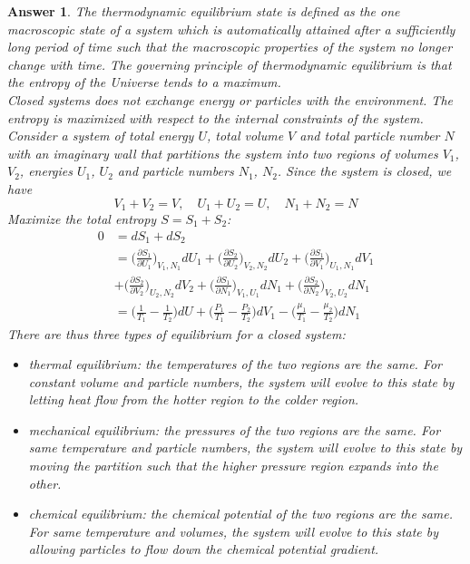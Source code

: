 \documentclass[a4paper]{article}
\newtheorem{ans}{Answer}[section]
\theoremstyle{new}
\begin{document}
\begin{ans}
The thermodynamic equilibrium state is defined as the one macroscopic state of a system which is automatically attained after a sufficiently long period of time such that the macroscopic properties of the system no longer change with time. The governing principle of thermodynamic equilibrium is that the entropy of the Universe tends to a maximum.\\[5pt]
Closed systems does not exchange energy or particles with the environment. The entropy is maximized with respect to the internal constraints of the system. Consider a system of total energy $U$, total volume $V$ and total particle number $N$ with an imaginary wall that partitions the system into two regions of volumes $V_1$, $V_2$, energies $U_1$, $U_2$ and particle numbers $N_1$, $N_2$. Since the system is closed, we have
$$V_1+V_2=V,\quad U_1+U_2=U,\quad N_1+N_2=N$$
Maximize the total entropy $S=S_1+S_2$:
\begin{align}
    0&=dS_1+dS_2\nonumber\\&=\bigg(\frac{\partial S_1}{\partial U_1}\bigg)_{V_1,N_1}dU_1+\bigg(\frac{\partial S_2}{\partial U_2}\bigg)_{V_2,N_2}dU_2+\bigg(\frac{\partial S_1}{\partial V_1}\bigg)_{U_1,N_1}dV_1\nonumber\\&+\bigg(\frac{\partial S_2}{\partial V_2}\bigg)_{U_2,N_2}dV_2+\bigg(\frac{\partial S_1}{\partial N_1}\bigg)_{V_1,U_1}dN_1+\bigg(\frac{\partial S_2}{\partial N_2}\bigg)_{V_2,U_2}dN_1\nonumber\\&=\bigg(\frac{1}{T_1}-\frac{1}{T_2}\bigg)dU+\bigg(\frac{P_1}{T_1}-\frac{P_2}{T_2}\bigg)dV_1-\bigg(\frac{\mu_1}{T_1}-\frac{\mu_2}{T_2}\bigg)dN_1\nonumber
\end{align}
There are thus three types of equilibrium for a closed system:
\begin{itemize}
    \item thermal equilibrium: the temperatures of the two regions are the same. For constant volume and particle numbers, the system will evolve to this state by letting heat flow from the hotter region to the colder region.
    \item mechanical equilibrium: the pressures of the two regions are the same. For same temperature and particle numbers, the system will evolve to this state by moving the partition such that the higher pressure region expands into the other.
    \item chemical equilibrium: the chemical potential of the two regions are the same. For same temperature and volumes, the system will evolve to this state by allowing particles to flow down the chemical potential gradient.

\end{itemize}
\end{ans}
\end{document}
